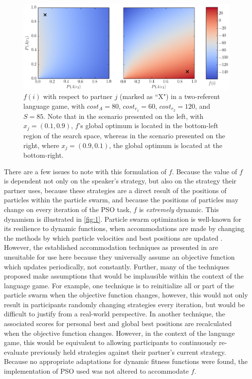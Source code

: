\documentclass[12pt,a4paper]{article}
\begin{document}
\begin{figure}
\centering
\includegraphics[width=\textwidth]{objective_function_cropped.png}
%
\caption{$f(i)$ with respect to partner $j$ (marked as ``X") in a two-referent language game, with $cost_A=80$, $cost_{r_1}=60$, $cost_{r_2}=120$, and $S=85$. Note that in the scenario presented on the left, with $x_j = (0.1, 0.9)$, $f$'s global optimum is located in the bottom-left region of the search space, whereas in the scenario presented on the right, where $x_j = (0.9, 0.1)$, the global optimum is located at the bottom-right.}
\label{fig:1}
\end{figure}

There are a few issues to note with this formulation of $f$. Because the value of $f$ is dependent not only on the speaker's strategy, but also on the strategy their partner uses, because these strategies are a direct result of the positions of particles within the particle swarm, and because the positions of particles may change on every iteration of the PSO task, $f$ is \textit{extremely} dynamic. This dynamism is illustrated in \autoref{fig:1}. Particle swarm optimization is well-known for its resilience to dynamic functions, when accommodations are made by changing the methods by which particle velocities and best positions are updated \citep{engelbrecht2005}. However, the established accommodation techniques as presented in \cite{engelbrecht2005} are unsuitable for use here because they universally assume an objective function which updates periodically, not constantly. Further, many of the techniques proposed make assumptions that would be implausible within the context of the \citeauthor{rohde2012} language game. For example, one technique is to reinitialize all or part of the particle swarm when the objective function changes, however, this would not only result in participants randomly changing strategies every iteration, but would be difficult to justify from a real-world perspective. In another technique, the associated scores for personal best and global best positions are recalculated when the objective function changes. However, in the context of the language game, this would be equivalent to allowing participants to continuously re-evaluate previously held strategies against their partner's current strategy. Because no appropriate adaptations for dynamic fitness functions were found, the implementation of PSO used was not altered to accommodate $f$.
\end{document}
